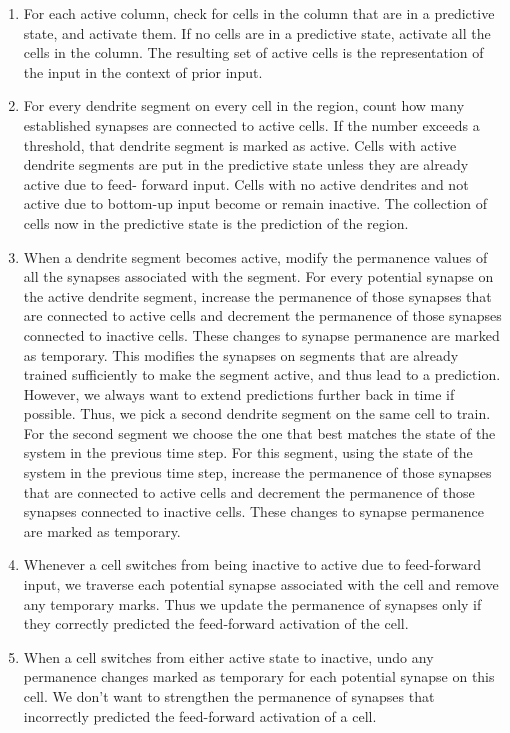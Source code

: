 \documentclass{report}
\begin{document}
\begin{enumerate}
\item For each active column, check for cells in the column that are
  in a predictive state, and activate them. If no cells are in a
  predictive state, activate all the cells in the column. The
  resulting set of active cells is the representation of the input in
  the context of prior input.

\item For every dendrite segment on every cell in the region, count
  how many established synapses are connected to active cells. If the
  number exceeds a threshold, that dendrite segment is marked as
  active. Cells with active dendrite segments are put in the
  predictive state unless they are already active due to feed- forward
  input. Cells with no active dendrites and not active due to
  bottom-up input become or remain inactive. The collection of cells
  now in the predictive state is the prediction of the region.

\item When a dendrite segment becomes active, modify the permanence
  values of all the synapses associated with the segment. For every
  potential synapse on the active dendrite segment, increase the
  permanence of those synapses that are connected to active cells and
  decrement the permanence of those synapses connected to inactive
  cells. These changes to synapse permanence are marked as temporary.
  This modifies the synapses on segments that are already trained
  sufficiently to make the segment active, and thus lead to a
  prediction. However, we always want to extend predictions further
  back in time if possible. Thus, we pick a second dendrite segment on
  the same cell to train. For the second segment we choose the one
  that best matches the state of the system in the previous time
  step. For this segment, using the state of the system in the
  previous time step, increase the permanence of those synapses that
  are connected to active cells and decrement the permanence of those
  synapses connected to inactive cells. These changes to synapse
  permanence are marked as temporary.

\item Whenever a cell switches from being inactive to active due to
  feed-forward input, we traverse each potential synapse associated
  with the cell and remove any temporary marks. Thus we update the
  permanence of synapses only if they correctly predicted the
  feed-forward activation of the cell.

\item When a cell switches from either active state to inactive, undo
  any permanence changes marked as temporary for each potential
  synapse on this cell. We don't want to strengthen the permanence of
  synapses that incorrectly predicted the feed-forward activation of a
  cell.
\end{enumerate}
\end{document}
